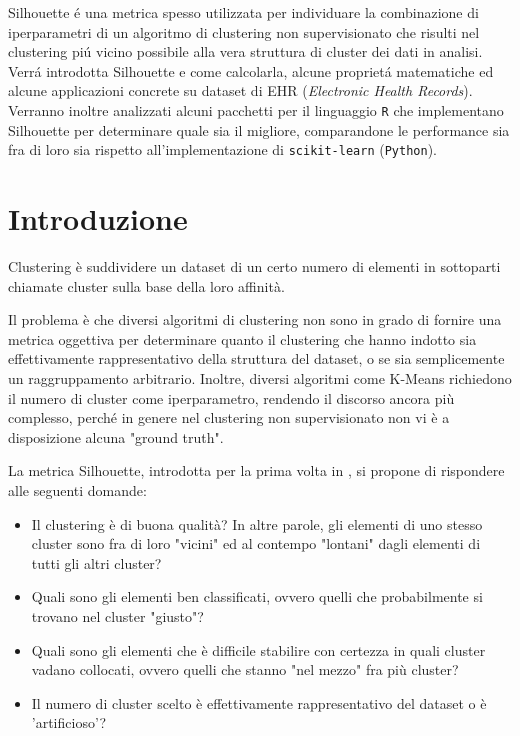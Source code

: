 \documentclass[12pt]{report}
\begin{document}
		Silhouette é una metrica spesso utilizzata per individuare
		la combinazione di iperparametri di un algoritmo di clustering
		non supervisionato che risulti nel clustering piú vicino possibile
		alla vera struttura di cluster dei dati in analisi. Verrá introdotta
		Silhouette e come calcolarla, alcune proprietá matematiche ed alcune
		applicazioni concrete su dataset di EHR (\textit{Electronic Health
		Records}). Verranno inoltre analizzati alcuni pacchetti per il
		linguaggio \texttt{R} che implementano Silhouette per determinare
		quale sia il migliore, comparandone le performance sia fra di
		loro sia rispetto all'implementazione di \texttt{scikit-learn}
		(\texttt{Python}).

	\chapter{Introduzione}

		Clustering è suddividere un dataset di un certo numero di elementi
		in sottoparti chiamate cluster sulla base della loro affinità.

		Il problema è che diversi algoritmi di clustering non sono in grado di
		fornire una metrica oggettiva per determinare quanto il clustering che
		hanno indotto sia effettivamente rappresentativo della struttura del
		dataset, o se sia semplicemente un raggruppamento arbitrario. Inoltre,
		diversi algoritmi come K-Means richiedono il numero di cluster come
		iperparametro, rendendo il discorso ancora più complesso, perché in
		genere nel clustering non supervisionato non vi è a disposizione
		alcuna "ground truth".

		La metrica Silhouette, introdotta per la prima volta in \cite{ROUSSEEUW198753},
		si propone di rispondere alle seguenti domande:

		\begin{itemize}
			\item
			Il clustering è di buona qualità? In altre parole, gli elementi di
			uno stesso cluster sono fra di loro "vicini" ed al contempo "lontani"
			dagli elementi di tutti gli altri cluster?
			\item
			Quali sono gli elementi ben classificati, ovvero quelli che probabilmente
			si trovano nel cluster "giusto"?
			\item
			Quali sono gli elementi che è difficile stabilire con certezza in quali
			cluster vadano collocati, ovvero quelli che stanno "nel mezzo" fra più
			cluster?
			\item
			Il numero di cluster scelto è effettivamente rappresentativo del dataset
			o è 'artificioso'?
		\end{itemize}
\end{document}
